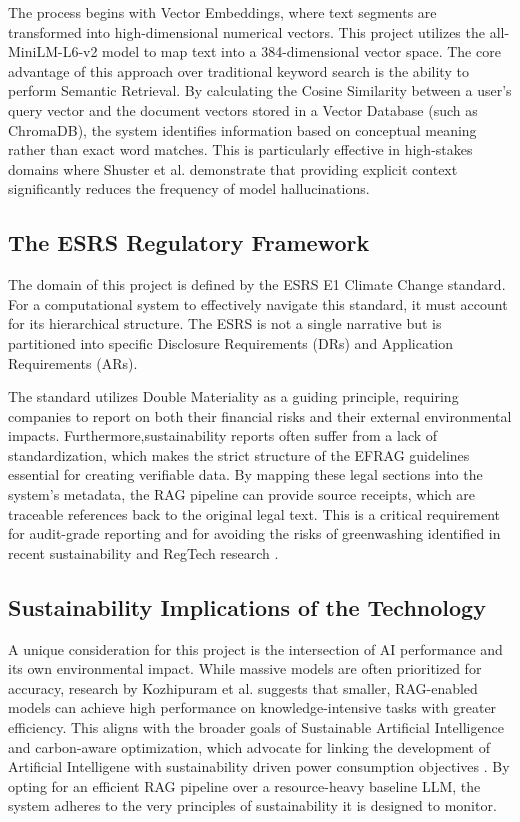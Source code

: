 \documentclass[12pt]{article}
\begin{document}
The process begins with Vector Embeddings, where text segments are transformed into high-dimensional numerical vectors. This project utilizes the all-MiniLM-L6-v2 model to map text into a 384-dimensional vector space. The core advantage of this approach over traditional keyword search is the ability to perform Semantic Retrieval. By calculating the Cosine Similarity between a user's query vector and the document vectors stored in a Vector Database (such as ChromaDB), the system identifies information based on conceptual meaning rather than exact word matches. This is particularly effective in high-stakes domains where Shuster et al. \cite{shuster2021retrievalaugmentationreduceshallucination} demonstrate that providing explicit context significantly reduces the frequency of model hallucinations.

\subsection{The ESRS Regulatory Framework}
The domain of this project is defined by the ESRS E1 Climate Change standard. For a computational system to effectively navigate this standard, it must account for its hierarchical structure. The ESRS is not a single narrative but is partitioned into specific Disclosure Requirements (DRs) and Application Requirements (ARs).

The standard utilizes Double Materiality as a guiding principle, requiring companies to report on both their financial risks and their external environmental impacts. Furthermore,sustainability reports often suffer from a lack of standardization, which makes the strict structure of the EFRAG guidelines essential for creating verifiable data. By mapping these legal sections into the system's metadata, the RAG pipeline can provide source receipts, which are traceable references back to the original legal text. This is a critical requirement for audit-grade reporting and for avoiding the risks of greenwashing identified in recent sustainability and RegTech research \cite{articleEPJ,articleICLR}.

\subsection{Sustainability Implications of the Technology}
A unique consideration for this project is the intersection of AI performance and its own environmental impact. While massive models are often prioritized for accuracy, research by Kozhipuram et al. \cite{info16090766} suggests that smaller, RAG-enabled models can achieve high performance on knowledge-intensive tasks with greater efficiency. This aligns with the broader goals of Sustainable Artificial Intelligence and carbon-aware optimization, which advocate for linking the development of Artificial Intelligene with sustainability driven power consumption objectives \cite{technologies13100477}. By opting for an efficient RAG pipeline over a resource-heavy baseline LLM, the system adheres to the very principles of sustainability it is designed to monitor.
\end{document}
